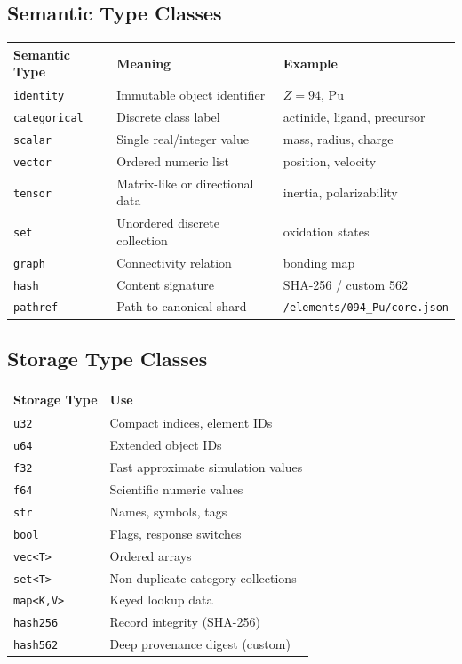 \documentclass[11pt, a4paper, oneside]{article}
\newcommand{\dtype}[1]{\texttt{#1}}
\begin{document}
\subsection{Semantic Type Classes}

\begin{center}
\begin{tabular}{@{} l l l @{}}
\toprule
\textbf{Semantic Type} & \textbf{Meaning} & \textbf{Example}\\
\midrule
\dtype{identity}    & Immutable object identifier      & $Z{=}94$, Pu\\
\dtype{categorical} & Discrete class label             & actinide, ligand, precursor\\
\dtype{scalar}      & Single real/integer value         & mass, radius, charge\\
\dtype{vector}      & Ordered numeric list              & position, velocity\\
\dtype{tensor}      & Matrix-like or directional data   & inertia, polarizability\\
\dtype{set}         & Unordered discrete collection     & oxidation states\\
\dtype{graph}       & Connectivity relation             & bonding map\\
\dtype{hash}        & Content signature                 & SHA-256 / custom 562\\
\dtype{pathref}     & Path to canonical shard           & \texttt{/elements/094\_Pu/core.json}\\
\bottomrule
\end{tabular}
\end{center}

\subsection{Storage Type Classes}

\begin{center}
\begin{tabular}{@{} l l @{}}
\toprule
\textbf{Storage Type} & \textbf{Use}\\
\midrule
\dtype{u32}       & Compact indices, element IDs\\
\dtype{u64}       & Extended object IDs\\
\dtype{f32}       & Fast approximate simulation values\\
\dtype{f64}       & Scientific numeric values\\
\dtype{str}       & Names, symbols, tags\\
\dtype{bool}      & Flags, response switches\\
\dtype{vec<T>}    & Ordered arrays\\
\dtype{set<T>}    & Non-duplicate category collections\\
\dtype{map<K,V>}  & Keyed lookup data\\
\dtype{hash256}   & Record integrity (SHA-256)\\
\dtype{hash562}   & Deep provenance digest (custom)\\
\bottomrule
\end{tabular}
\end{center}
\end{document}
